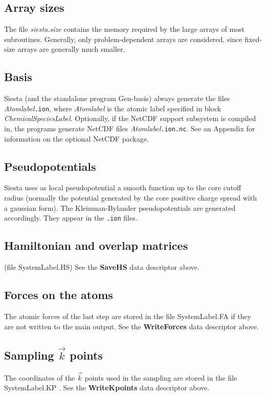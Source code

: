\documentclass[11pt]{article}
\begin{document}
\subsection{Array sizes}
 
The file {\it siesta.size} contains the memory required by the
large arrays of most subroutines. Generally, only problem-dependent
arrays are considered, since fixed-size arrays are generally much smaller.


\subsection{Basis}
{\sc Siesta} (and the standalone program {\sc Gen-basis}) 
always generate the files
{\it Atomlabel}{\tt .ion}, where {\it Atomlabel} is the atomic label
specified in block {\it ChemicalSpeciesLabel}.  Optionally, if
the NetCDF support subsystem is compiled in, the programs generate
NetCDF files 
{\it Atomlabel}{\tt .ion.nc}.
See an Appendix for information on the optional NetCDF package.

\subsection{Pseudopotentials}
 {\sc Siesta} uses as local pseudopotential a smooth
function up to the core cutoff radius (normally the potential generated
by the core positive charge spread with a gaussian form). The
Kleinman-Bylander pseudopotentials are generated
accordingly. They appear in the {\tt .ion} files.


\subsection{Hamiltonian and overlap matrices}
(file SystemLabel.HS) See the {\bf SaveHS} data descriptor above.


\subsection{Forces on the atoms}
The atomic forces of the last step are stored in the file
SystemLabel.FA if they are not written to the main output.
See the {\bf WriteForces} data descriptor above.


\subsection{Sampling $\vec k$ points}
The coordinates of the $\vec k$ points used in the sampling
are stored in the file SystemLabel.KP .
See the {\bf WriteKpoints} data descriptor above.
\end{document}
